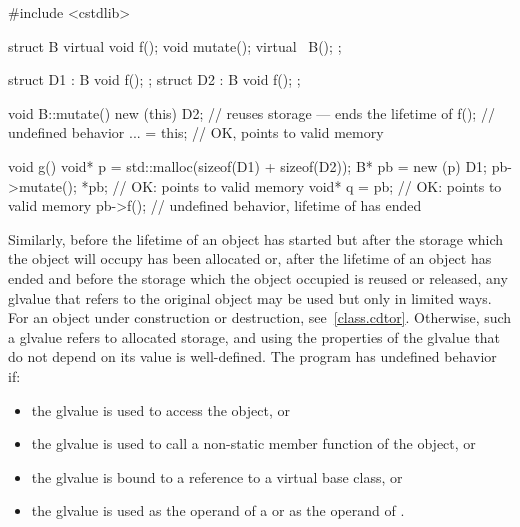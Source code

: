\begin{example}
\begin{codeblock}
#include <cstdlib>

struct B {
  virtual void f();
  void mutate();
  virtual ~B();
};

struct D1 : B { void f(); };
struct D2 : B { void f(); };

void B::mutate() {
  new (this) D2;    // reuses storage --- ends the lifetime of 
  f();              // undefined behavior
  ... = this;       // OK,  points to valid memory
}

void g() {
  void* p = std::malloc(sizeof(D1) + sizeof(D2));
  B* pb = new (p) D1;
  pb->mutate();
  *pb;              // OK:  points to valid memory
  void* q = pb;     // OK:  points to valid memory
  pb->f();          // undefined behavior, lifetime of  has ended
}
\end{codeblock}
\end{example}

\pnum
Similarly, before the lifetime of an object has started but after the
storage which the object will occupy has been allocated or, after the
lifetime of an object has ended and before the storage which the object
occupied is reused or released, any glvalue that refers to the original
object may be used but only in limited ways.
For an object under construction or destruction, see~\ref{class.cdtor}.
Otherwise, such
a glvalue refers to
allocated storage, and using the
properties of the glvalue that do not depend on its value is
well-defined. The program has undefined behavior if:
\begin{itemize}
\item the glvalue is used to access the object, or
\item the glvalue is used to call a non-static member function of the object, or
\item the glvalue is bound to a reference to a virtual base class, or
\item the glvalue is used as the operand of a
 or as the operand of
.
\end{itemize}

